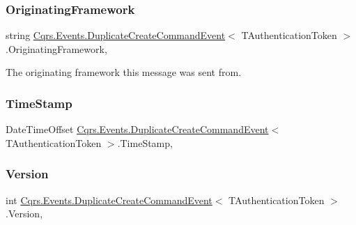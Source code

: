 \subsubsection{\texorpdfstring{Originating\+Framework}{OriginatingFramework}}
{\footnotesize\ttfamily string \hyperlink{classCqrs_1_1Events_1_1DuplicateCreateCommandEvent}{Cqrs.\+Events.\+Duplicate\+Create\+Command\+Event}$<$ T\+Authentication\+Token $>$.Originating\+Framework\hspace{0.3cm}{\ttfamily [get]}, {\ttfamily [set]}}



The originating framework this message was sent from. 

\mbox{\label{classCqrs_1_1Events_1_1DuplicateCreateCommandEvent_ae732d7442d4eed8329e39a500433c96c_ae732d7442d4eed8329e39a500433c96c}} 
\subsubsection{\texorpdfstring{Time\+Stamp}{TimeStamp}}
{\footnotesize\ttfamily Date\+Time\+Offset \hyperlink{classCqrs_1_1Events_1_1DuplicateCreateCommandEvent}{Cqrs.\+Events.\+Duplicate\+Create\+Command\+Event}$<$ T\+Authentication\+Token $>$.Time\+Stamp\hspace{0.3cm}{\ttfamily [get]}, {\ttfamily [set]}}

\mbox{\label{classCqrs_1_1Events_1_1DuplicateCreateCommandEvent_ad2d19f109697e676edf4ad7dc7b19bdd_ad2d19f109697e676edf4ad7dc7b19bdd}} 
\subsubsection{\texorpdfstring{Version}{Version}}
{\footnotesize\ttfamily int \hyperlink{classCqrs_1_1Events_1_1DuplicateCreateCommandEvent}{Cqrs.\+Events.\+Duplicate\+Create\+Command\+Event}$<$ T\+Authentication\+Token $>$.Version\hspace{0.3cm}{\ttfamily [get]}, {\ttfamily [set]}}


